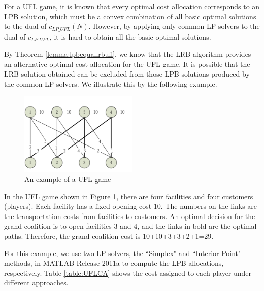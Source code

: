 \documentclass[ijoc,nonblindrev]{informs3} %
\begin{document}
For a UFL game, it is known that every optimal cost allocation corresponds to an LPB solution, which must be a convex combination of all basic optimal solutions to the dual of $c_{LP\_UFL}(N)$. However, by applying only common LP solvers to the dual of $c_{LP\_UFL}$, it is hard to obtain all the basic optimal solutions.

By Theorem \ref{lemma:lpbequallrbufl}, we know that the LRB algorithm provides an alternative optimal cost allocation for the UFL game. It is possible that the LRB solution obtained can be excluded from those LPB solutions produced by the common LP solvers. We illustrate this by the following example.

\begin{figure}[H]
\centering
\vspace{-0.1em}
\includegraphics[width=0.5\textwidth]{figure-1.pdf}
\caption{\label{figure:exampleUFL}An example of a UFL game}
\vspace{-3mm}
\end{figure}

In the UFL game shown in Figure \ref{figure:exampleUFL}, there are four facilities and four customers (players). Each facility has a fixed opening cost 10. The numbers on the links are the transportation costs from facilities to customers. An optimal decision for the grand coalition is to open facilities 3 and 4, and the links in bold are the optimal paths. Therefore, the grand coalition cost is 10+10+3+3+2+1=29.

For this example, we use two LP solvers, the ``Simplex" and ``Interior Point" methods, in MATLAB Release 2011a to compute the LPB allocations, respectively.
Table \ref{table:UFLCA} shows the cost assigned to each player under different approaches.
\end{document}
